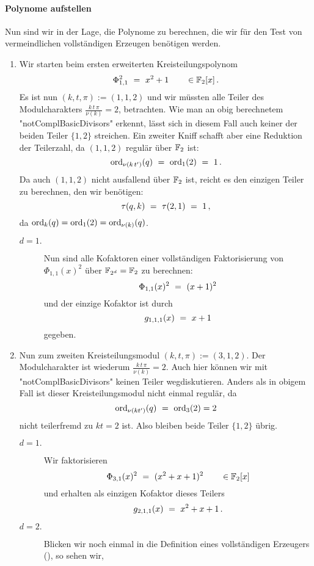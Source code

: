 \paragraph{Polynome aufstellen} Nun sind wir in der Lage, die Polynome zu
berechnen, die wir für den Test von vermeindlichen vollständigen Erzeugen
benötigen werden. 
\begin{enumerate}
  \item Wir starten beim ersten erweiterten Kreisteilungspolynom
    \[ \Phi_{1,1}^2 \ =\  x^2 + 1 \qquad \in \mathbb{F}_2[x]\,. \]
    Es ist nun $(k,t,\pi) := (1,1,2)$ und wir 
    müssten alle Teiler des Modulcharakters $\frac{k\,t\,\pi}{\nu(k)} = 2$,
    betrachten. Wie man an obig berechnetem "notComplBasicDivisors" erkennt, 
    lässt sich in diesem Fall auch keiner der beiden Teiler $\{1,2\}$
    streichen. Ein zweiter Kniff schafft aber eine Reduktion der Teilerzahl, da 
    $(1,1,2)$ regulär über $\mathbb{F}_2$ ist:
    \[ \operatorname{ord}_{\nu(k\,t')}(q) \ =\  \operatorname{ord}_{1}(2) \ =\  1 \,. \]
    Da auch $(1,1,2)$ nicht ausfallend über $\mathbb{F}_2$ ist, reicht es den einzigen
    Teiler zu berechnen, den wir benötigen:
    \[ \tau(q,k) \ =\  \tau(2,1) \ =\  1\,,\]
    da $\operatorname{ord}_k(q) = \operatorname{ord}_1(2) = \operatorname{ord}_{\nu(k)}(q)$.
    \begin{description}
      \item[$d=1.$] Nun sind alle Kofaktoren einer vollständigen Faktorisierung
        von $\Phi_{1,1}(x)^2$ über $\mathbb{F}_{2^d} = \mathbb{F}_2$ zu berechnen:
        \[ \Phi_{1,1}(x)^2 \ =\  (x+1)^2\]
        und der einzige Kofaktor ist durch
        \[ g_{1,1,1}(x) \ =\  x+1 \]
        gegeben.
    \end{description}
  \item Nun zum zweiten Kreisteilungsmodul $(k,t,\pi) := (3,1,2)$. Der
    Modulcharakter ist wiederum $\frac{k\,t\,\pi}{\nu(k)} = 2$. Auch hier
    können wir mit "notComplBasicDivisors" keinen Teiler wegdiskutieren. Anders
    als in obigem Fall ist dieser Kreisteilungsmodul nicht einmal regulär, da 
    \[ \operatorname{ord}_{\nu(kt')}(q) \ =\  \operatorname{ord}_3(2) = 2\]
    nicht teilerfremd zu $kt=2$ ist.
    Also bleiben beide Teiler $\{1,2\}$ übrig.
    \begin{description}
      \item[$d=1.$] Wir faktorisieren 
        \[ \Phi_{3,1}(x)^2 \ =\  (x^2+x+1)^2 \qquad \in \mathbb{F}_2[x] \]
        und erhalten als einzigen Kofaktor dieses Teilers
        \[ g_{2,1,1}(x) \ =\  x^2+x+1\,.\]
      \item[$d=2.$] Blicken wir noch einmal in die Definition eines
        vollständigen Erzeugers (), so sehen wir,

\end{description}
\end{enumerate}
